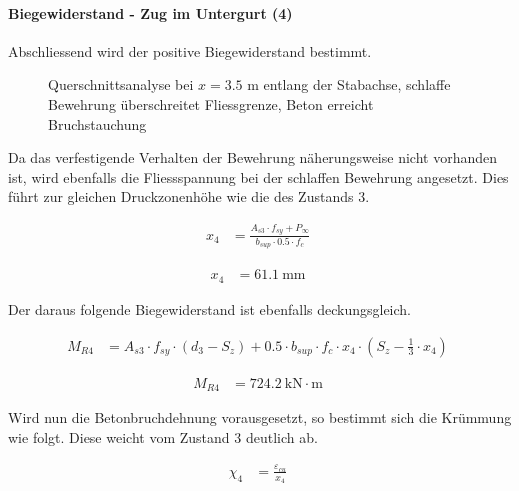 \documentclass[
  11pt,
  letterpaper,
]{scrreprt}
\let\oldparagraph\paragraph
\renewcommand{\paragraph}[1]{\oldparagraph{#1}\mbox{}}
\begin{document}
\paragraph{Biegewiderstand - Zug im Untergurt
(4)}\label{biegewiderstand---zug-im-untergurt-4}

Abschliessend wird der positive Biegewiderstand bestimmt.

\begin{figure}[H]


\caption{\label{fig-t6_qs_My_neg}Querschnittsanalyse bei \(x=3.5\) m
entlang der Stabachse, schlaffe Bewehrung überschreitet Fliessgrenze,
Beton erreicht Bruchstauchung}

\end{figure}%

Da das verfestigende Verhalten der Bewehrung näherungsweise nicht
vorhanden ist, wird ebenfalls die Fliessspannung bei der schlaffen
Bewehrung angesetzt. Dies führt zur gleichen Druckzonenhöhe wie die des
Zustands \(3\).

$$
\begin{aligned}
x_{4} &= \frac{ A_{s3} \cdot f_{sy} + P_{\infty} }{ b_{sup} \cdot 0.5 \cdot f_{c} } \; 
\end{aligned}
$$

$$
\begin{aligned}
x_{4} &= 61.1\ \mathrm{mm} \;
\end{aligned}
$$

Der daraus folgende Biegewiderstand ist ebenfalls deckungsgleich.

$$
\begin{aligned}
M_{R4} &= A_{s3} \cdot f_{sy} \cdot \left( d_{3} - S_{z} \right) + 0.5 \cdot b_{sup} \cdot f_{c} \cdot x_{4} \cdot \left( S_{z} - \frac{ 1 }{ 3 } \cdot x_{4} \right) \; 
\end{aligned}
$$

$$
\begin{aligned}
M_{R4} &= 724.2\ \mathrm{kN} \cdot \mathrm{m} \;
\end{aligned}
$$

Wird nun die Betonbruchdehnung vorausgesetzt, so bestimmt sich die
Krümmung wie folgt. Diese weicht vom Zustand \(3\) deutlich ab.

$$
\begin{aligned}
\chi_{4} &= \frac{ \varepsilon_{cu} }{ x_{4} } \; 
\end{aligned}
$$
\end{document}

